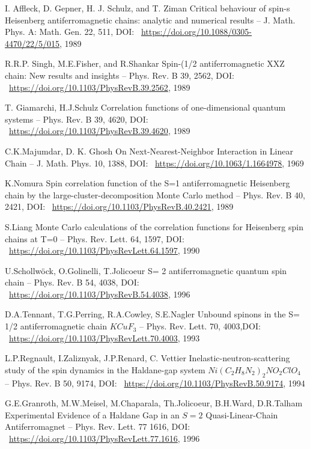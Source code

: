 \documentclass[11pt]{article}
\begin{document}
\begin{thebibliography}{3}
I. Affleck, D. Gepner, H. J. Schulz, and T. Ziman Critical behaviour of spin-s Heisenberg antiferromagnetic chains: analytic and numerical results -- J. Math. Phys. A: Math. Gen. 22, 511, DOI: ~\url{https://doi.org/10.1088/0305-4470/22/5/015}, 1989

R.R.P. Singh, M.E.Fisher, and R.Shankar Spin-(1/2 antiferromagnetic XXZ chain: New results and insights -- Phys. Rev. B 39, 2562, DOI: ~\url{https://doi.org/10.1103/PhysRevB.39.2562}, 1989

T. Giamarchi, H.J.Schulz Correlation functions of one-dimensional quantum systems -- Phys. Rev. B 39, 4620, DOI: ~\url{https://doi.org/10.1103/PhysRevB.39.4620}, 1989

C.K.Majumdar, D. K. Ghosh On Next-Nearest-Neighbor Interaction in Linear Chain -- J. Math. Phys. 10, 1388, DOI: ~\url{https://doi.org/10.1063/1.1664978}, 1969

K.Nomura Spin correlation function of the S=1 antiferromagnetic Heisenberg chain by the large-cluster-decomposition Monte Carlo method -- Phys. Rev. B 40, 2421, DOI: ~\url{https://doi.org/10.1103/PhysRevB.40.2421}, 1989

S.Liang Monte Carlo calculations of the correlation functions for Heisenberg spin chains at T=0 -- Phys. Rev. Lett. 64, 1597, DOI: ~\url{https://doi.org/10.1103/PhysRevLett.64.1597}, 1990

U.Schollwöck, O.Golinelli, T.Jolicoeur S= 2 antiferromagnetic quantum spin chain -- Phys. Rev. B 54, 4038, DOI: ~\url{https://doi.org/10.1103/PhysRevB.54.4038}, 1996

D.A.Tennant, T.G.Perring, R.A.Cowley, S.E.Nagler Unbound spinons in the S= 1/2 antiferromagnetic chain $KCuF_3$ -- Phys. Rev. Lett. 70, 4003,DOI: ~\url{https://doi.org/10.1103/PhysRevLett.70.4003}, 1993

L.P.Regnault, I.Zaliznyak, J.P.Renard, C. Vettier Inelastic-neutron-scattering study of the spin dynamics in the Haldane-gap system $Ni(C_2H_8N_2)_2NO_2ClO_4$ -- Phys. Rev. B 50, 9174, DOI: ~\url{https://doi.org/10.1103/PhysRevB.50.9174}, 1994

G.E.Granroth, M.W.Meisel, M.Chaparala, Th.Jolicoeur, B.H.Ward, D.R.Talham Experimental Evidence of a Haldane Gap in an $S=2$ Quasi-Linear-Chain Antiferromagnet -- Phys. Rev. Lett. 77 1616, DOI: ~\url{https://doi.org/10.1103/PhysRevLett.77.1616}, 1996


\end{thebibliography}
\end{document}
